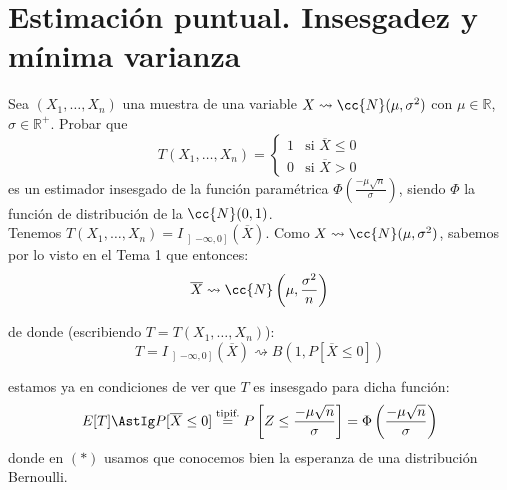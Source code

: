 \newpage
\section{Estimación puntual. Insesgadez y mínima varianza}

\begin{ejercicio}
    Sea $(X_1, \ldots, X_n)$ una muestra de una variable $X\rightsquigarrow\cc{N}(\mu, \sigma^2)$ con $\mu\in \mathbb{R}$, $\sigma\in \mathbb{R}^+$. Probar que
    \begin{equation*}
        T(X_1, \ldots, X_n) = \left\{\begin{array}{ll}
            1 & \text{si\ } \overline{X}\leq 0 \\
            0 & \text{si\ } \overline{X} > 0
        \end{array}\right. 
    \end{equation*}
    es un estimador insesgado de la función paramétrica $\Phi\left(\frac{-\mu \sqrt{n}}{\sigma}\right)$, siendo $\Phi$ la función de distribución de la $\cc{N}(0,1)$.\\

    \noindent
    Tenemos $T(X_1, \ldots, X_n) = I_{\left]-\infty,0\right]}(\overline{X})$. Como $X\rightsquigarrow \cc{N}(\mu, \sigma^2)$, sabemos por lo visto en el Tema 1 que entonces:
    \begin{equation*}
        \overline{X} \rightsquigarrow \cc{N}\left(\mu, \frac{\sigma^2}{n}\right)
    \end{equation*}

    de donde (escribiendo $T=T(X_1,\ldots,X_n)$):
    \begin{equation*}
    T = I_{\left]-\infty,0\right]}(\overline{X}) \rightsquigarrow B(1,P[\overline{X}\leq 0])
    \end{equation*}

    estamos ya en condiciones de ver que $T$ es insesgado para dicha función:
    \begin{equation*}
        E[T] \AstIg P[\overline{X}\leq 0] \stackrel{\text{tipif.}}{=} P\left[Z \leq \dfrac{-\mu\sqrt{n}}{\sigma}\right] = \Phi\left(\dfrac{-\mu\sqrt{n}}{\sigma}\right) 
    \end{equation*}
    donde en $(\ast)$ usamos que conocemos bien la esperanza de una distribución Bernoulli.
\end{ejercicio}

